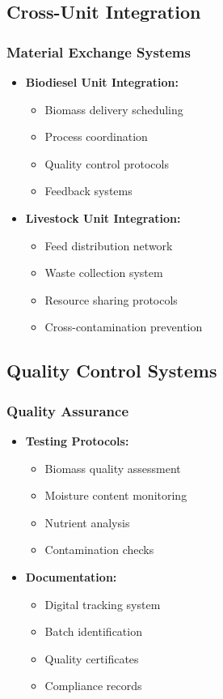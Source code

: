 \subsection{Cross-Unit Integration}

\subsubsection{Material Exchange Systems}
\begin{itemize}
    \item \textbf{Biodiesel Unit Integration:}
    \begin{itemize}
        \item Biomass delivery scheduling
        \item Process coordination
        \item Quality control protocols
        \item Feedback systems
    \end{itemize}
    
    \item \textbf{Livestock Unit Integration:}
    \begin{itemize}
        \item Feed distribution network
        \item Waste collection system
        \item Resource sharing protocols
        \item Cross-contamination prevention
    \end{itemize}
\end{itemize}

\subsection{Quality Control Systems}

\subsubsection{Quality Assurance}
\begin{itemize}
    \item \textbf{Testing Protocols:}
    \begin{itemize}
        \item Biomass quality assessment
        \item Moisture content monitoring
        \item Nutrient analysis
        \item Contamination checks
    \end{itemize}
    
    \item \textbf{Documentation:}
    \begin{itemize}
        \item Digital tracking system
        \item Batch identification
        \item Quality certificates
        \item Compliance records
    \end{itemize}
\end{itemize}

